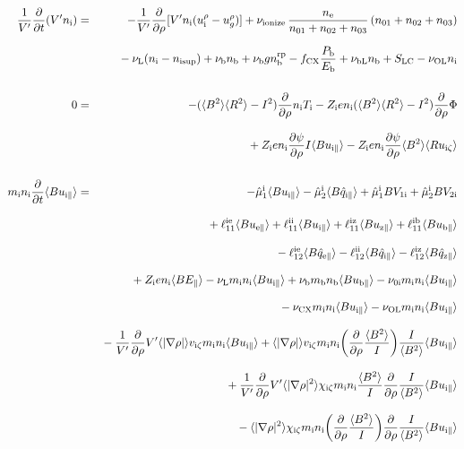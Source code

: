 \documentclass[11pt]{article}
\def\r#1{{\rm#1}}
\def\aves#1{\langle#1\rangle}
\def\dd#1#2{\frac{\partial #1}{\partial #2}}
\def\para{\parallel}
\def\ddrho{\frac{\partial}{\partial\rho}}
\def\ddt{\frac{\partial}{\partial t}}
\def\mi{m_\r{i}}
\def\mb{m_\r{b}}
\def\nee{n_\r{e}}
\def\ni{n_\r{i}}
\def\nb{n_\r{b}}
\def\Ti{T_\r{i}}
\def\Zi{Z_\r{i}}
\def\uzt#1{u_{\r{#1}\zeta}}
\def\upara#1{u_{\r{#1}\para}}
\def\qhatpara#1{\hat{q}_{\r{#1}\para}}
\def\urho#1{u_\r{#1}^\rho}
\def\ugrho{u_{g}^\rho}
\def\chis#1{\chi_\r{#1}}
\def\nun#1{\nu_\r{0#1}}
\def\nsup#1{n_\r{#1sup}}
\def\nbrp{n_\r{b}^\r{rp}}
\def\bri{\aves{B^2}\aves{R^2} - I^2}
\def\Pb{P_\r{b}}
\def\Eb{E_\r{b}}
\def\nna{n_{01}}
\def\nnb{n_{02}}
\def\nnc{n_{03}}
\def\fCX{f_\r{CX}}
\def\nuL{\nu_\r{L}}
\def\nuCX{\nu_\r{CX}}
\def\nuion{\nu_\r{ionize}}
\def\nub{\nu_\r{b}}
\def\nuOL{\nu_\r{OL}}
\def\nubL{\nu_\r{bL}}
\begin{document}
%
\begin{eqnarray}
  \frac{1}{V'} \ddt ( V' \ni ) &=&
%
  - \frac{1}{V'} \ddrho [ V' \ni (\urho{i} - \ugrho) ]
%
  + \nuion\, \frac{\nee}{\nna + \nnb + \nnc}\, (\nna + \nnb
  + \nnc)
\nonumber\\[2.5mm]&&{}
%
  - \nuL (\ni - \nsup{i}) 
%
  + \nub \nb
%
  + \nub g \nbrp
%
  - \fCX \frac{\Pb}{\Eb}
%
  + \nubL \nb
%
  + S_\r{LC}
%
  - \nuOL \ni
%
\\[5mm]
  0 &=&
%
  -           ( \bri ) \ddrho \ni \Ti
%
  - \Zi e \ni ( \bri ) \ddrho \Phi
\nonumber\\[3mm]&&{}
%
  + \Zi e \ni \dd{\psi}{\rho} I          \aves{B\upara{i}}
%
  - \Zi e \ni \dd{\psi}{\rho} \aves{B^2} \aves{R\uzt{i}}
\\[5mm]
  \mi \ni \ddt \aves{B \upara{i}} &=&
%
  - \hat{\mu}_1^\r{i} \aves{B \upara{i}} 
  - \hat{\mu}_2^\r{i} \aves{B \qhatpara{i}}
%
  + \hat{\mu}_1^\r{i} {B V_{1\r{i}}} 
  + \hat{\mu}_2^\r{i} {B V_{2\r{i}}}
\nonumber\\[3mm]&&{}
%
  + \ell_{11}^{\r{ie}} \aves{B \upara{e}}
  + \ell_{11}^{\r{ii}} \aves{B \upara{i}}
  + \ell_{11}^{\r{iz}} \aves{B \upara{z}}
  + \ell_{11}^{\r{ib}} \aves{B \upara{b}}
\nonumber\\[3mm]&&{}
%
  - \ell_{12}^{\r{ie}} \aves{B \qhatpara{e}}
  - \ell_{12}^{\r{ii}} \aves{B \qhatpara{i}}
  - \ell_{12}^{\r{iz}} \aves{B \qhatpara{z}}
\nonumber\\[3mm]&&{}
%
  + \Zi e \ni \aves{B E_\para}
%
%
%
  - \nuL  \mi \ni \aves{B \upara{i}}
%
  + \nub  \mb \nb \aves{B \upara{b}}
%
  - \nun{i} \mi \ni \aves{B \upara{i}}
\nonumber\\[3mm]&&{}
%
  - \nuCX \mi \ni \aves{B \upara{i}}
%
  - \nuOL \mi \ni \aves{B \upara{i}}
\nonumber\\[3mm]&&{}
%
  - \frac{1}{V'} \ddrho V' \aves{|\nabla \rho|} v_{\r{i}\zeta} \mi \ni \aves{B \upara{i}}
%
  + \aves{|\nabla \rho|} v_{\r{i}\zeta} \mi \ni 
  \biggl(\ddrho \frac{\aves{B^2}}{I} \biggl) \frac{I}{\aves{B^2}} \aves{B \upara{i}}
\nonumber\\[3mm]&&{}
%
  + \frac{1}{V'} \ddrho V' \aves{|\nabla \rho|^2} \chis{i\zeta} \mi \ni
  \frac{\aves{B^2}}{I} \ddrho \frac{I}{\aves{B^2}} \aves{B \upara{i}}
\nonumber\\[3mm]&&{}
%
  - \aves{|\nabla \rho|^2} \chis{i\zeta} \mi \ni \biggl( \ddrho
  \frac{\aves{B^2}}{I} \biggr) \ddrho \frac{I}{\aves{B^2}} \aves{B \upara{i}}

\end{eqnarray}
\end{document}
